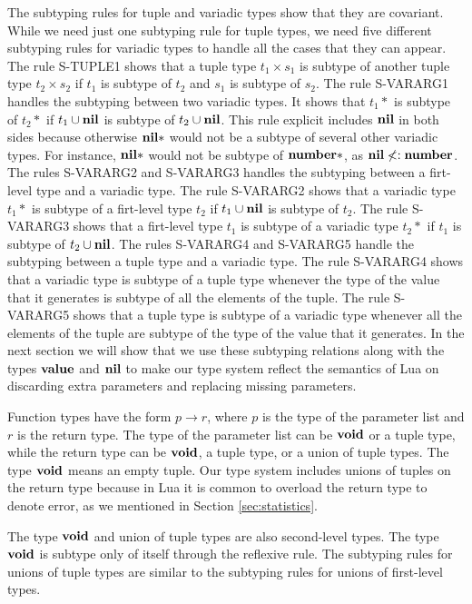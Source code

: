 The subtyping rules for tuple and variadic types show that they are covariant.
While we need just one subtyping rule for tuple types,
we need five different subtyping rules for variadic types
to handle all the cases that they can appear.
The rule \textsc{S-TUPLE1} shows that a tuple type $t_{1} \times s_{1}$
is subtype of another tuple type $t_{2} \times s_{2}$ if
$t_{1}$ is subtype of $t_{2}$ and $s_{1}$ is subtype of $s_{2}$.
The rule \textsc{S-VARARG1} handles the subtyping between two variadic types.
It shows that $t_{1}{*}$ is subtype of $t_{2}{*}$
if $t_{1} \cup \mathbf{nil}$ is subtype of $t_{2} \cup \mathbf{nil}$.
This rule explicit includes $\mathbf{nil}$ in both sides because otherwise
$\mathbf{nil}{*}$ would not be a subtype of several other variadic types.
For instance, $\mathbf{nil}{*}$ would not be subtype of $\mathbf{number}{*}$,
as $\mathbf{nil} \not<: \mathbf{number}$.
The rules \textsc{S-VARARG2} and \textsc{S-VARARG3} handles the
subtyping between a firt-level type and a variadic type.
The rule \textsc{S-VARARG2} shows that a variadic type $t_{1}{*}$ is
subtype of a firt-level type $t_{2}$ if $t_{1} \cup \mathbf{nil}$ is subtype of $t_{2}$.
The rule \textsc{S-VARARG3} shows that a firt-level type $t_{1}$
is subtype of a variadic type $t_{2}{*}$ if $t_{1}$ is subtype of $t_{2} \cup \mathbf{nil}$.
The rules \textsc{S-VARARG4} and \textsc{S-VARARG5} handle the
subtyping between a tuple type and a variadic type.
The rule \textsc{S-VARARG4} shows that a variadic type is subtype of
a tuple type whenever the type of the value that it generates is
subtype of all the elements of the tuple.
The rule \textsc{S-VARARG5} shows that a tuple type is subtype of a
variadic type whenever all the elements of the tuple are subtype of
the type of the value that it generates.
In the next section we will show that we use these subtyping relations
along with the types $\mathbf{value}$ and $\mathbf{nil}$ to make our type system reflect
the semantics of Lua on discarding extra parameters and
replacing missing parameters.

Function types have the form $p \rightarrow r$, where
$p$ is the type of the parameter list and $r$ is the return type.
The type of the parameter list can be $\mathbf{void}$ or a tuple type,
while the return type can be $\mathbf{void}$, a tuple type, or a union of
tuple types.
The type $\mathbf{void}$ means an empty tuple.
Our type system includes unions of tuples on the return type because
in Lua it is common to overload the return type to denote error,
as we mentioned in Section \ref{sec:statistics}.

The type $\mathbf{void}$ and union of tuple types are also second-level types.
The type $\mathbf{void}$ is subtype only of itself through the reflexive rule.
The subtyping rules for unions of tuple types are similar to the
subtyping rules for unions of first-level types.

